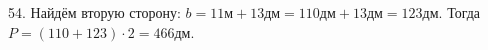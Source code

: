 54. Найдём вторую сторону: $b=11\text{м}+13\text{дм}=110\text{дм}+13\text{дм}=123$дм. Тогда $P=(110+123)\cdot2=466$дм.\\
